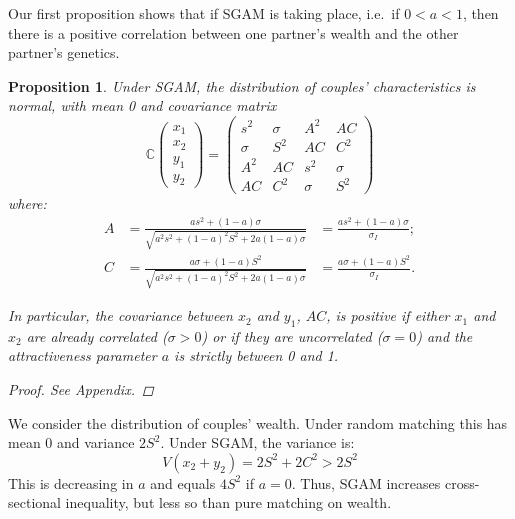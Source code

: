 \documentclass[
]{article}
\newtheorem{proposition}{Proposition}
\theoremstyle{definition}
\theoremstyle{definition}
\theoremstyle{definition}
\theoremstyle{definition}
\theoremstyle{remark}
\begin{document}
Our first proposition shows that if SGAM is taking place, i.e.~if \(0 < a < 1\), then
there is a positive correlation between one partner's wealth and the other
partner's genetics.

\begin{proposition}\label{prop-couples-SGAM}
Under SGAM, the distribution of couples' characteristics is normal, with mean 0
and covariance matrix
\begin{equation}\label{cov-couples-SGAM}
\mathbb{C}\left( 
\begin{array}{c}
x_{1} \\ 
x_{2} \\ 
y_{1} \\ 
y_{2}%
\end{array}%
\right) =\allowbreak \left( 
\begin{array}{cccc}
s^{2} & \sigma  & A^{2} & AC \\ 
\sigma  & S^{2} & AC & C^{2} \\ 
A^{2} & AC & s^{2} & \sigma  \\ 
AC & C^{2} & \sigma  & S^{2}%
\end{array}%
\right) \allowbreak 
\end{equation}
where:
\begin{align*}
A &= \frac{as^{2}+\left( 1-a\right) \sigma }{\sqrt{a^{2}s^{2}+\left(
1-a\right) ^{2}S^{2}+2a\left( 1-a\right) \sigma }} &= \frac{as^{2}+\left( 1-a\right) \sigma }{\sigma_I}; \\
C &= \frac{a\sigma +\left( 1-a\right) S^{2}}{\sqrt{a^{2}s^{2}+\left(
1-a\right) ^{2}S^{2}+2a\left( 1-a\right) \sigma }} &= \frac{a\sigma +\left( 1-a\right) S^{2}}{\sigma_I}.
\end{align*}

In particular, the covariance between $x_2$ and $y_1$, $AC$, is positive if
either $x_1$ and $x_2$ are already correlated ($\sigma > 0$) or if they are
uncorrelated ($\sigma = 0$) and the attractiveness parameter $a$ is strictly
between 0 and 1.

\begin{proof}
See Appendix.
\end{proof}
\end{proposition}

We consider the distribution of couples' wealth. Under random matching this has
mean \(0\) and variance \(2S^2\). Under SGAM, the variance is:
\[
V(x_{2}+y_{2}) = 2S^{2} + 2C^{2} > 2S^{2} 
\]
This is decreasing in \(a\) and equals \(4S^2\) if \(a = 0\). Thus, SGAM increases
cross-sectional inequality, but less so than pure matching on wealth.
\end{document}
